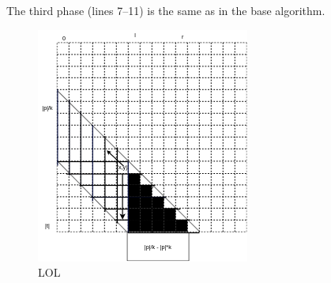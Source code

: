 The third phase (lines 7--11) is the same as in the base algorithm.

 

\begin{figure}
	\centering
   \includegraphics[width=0.4\columnwidth]{figures/M2.png}
   \caption{LOL}\label{M2}
\end{figure}




